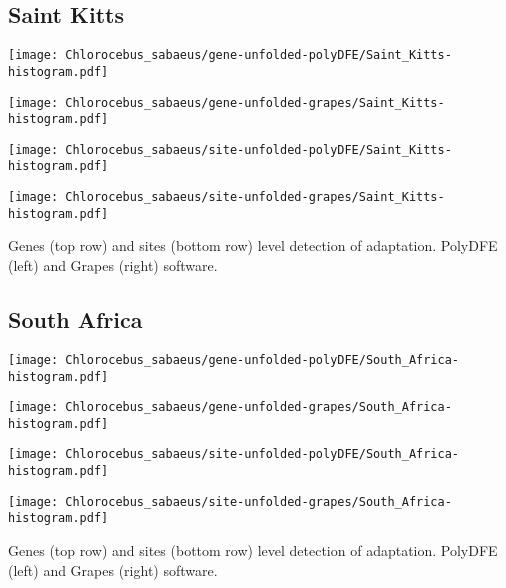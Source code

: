 \documentclass{article}
\begin{document}
\subsection{Saint Kitts}
\centering
\begin{minipage}{0.49\linewidth}
    \texttt{[image: Chlorocebus\_sabaeus/gene-unfolded-polyDFE/Saint\_Kitts-histogram.pdf]}
\end{minipage}%
\hfill
\begin{minipage}{0.49\linewidth}
    \texttt{[image: Chlorocebus\_sabaeus/gene-unfolded-grapes/Saint\_Kitts-histogram.pdf]}
\end{minipage}
\begin{minipage}{0.49\linewidth}
    \texttt{[image: Chlorocebus\_sabaeus/site-unfolded-polyDFE/Saint\_Kitts-histogram.pdf]}
\end{minipage}%
\hfill
\begin{minipage}{0.49\linewidth}
    \texttt{[image: Chlorocebus\_sabaeus/site-unfolded-grapes/Saint\_Kitts-histogram.pdf]}
\end{minipage}
\flushleft
Genes (top row) and sites (bottom row) level detection of adaptation.
PolyDFE (left) and Grapes (right) software.

\subsection{South Africa}
\centering
\begin{minipage}{0.49\linewidth}
    \texttt{[image: Chlorocebus\_sabaeus/gene-unfolded-polyDFE/South\_Africa-histogram.pdf]}
\end{minipage}%
\hfill
\begin{minipage}{0.49\linewidth}
    \texttt{[image: Chlorocebus\_sabaeus/gene-unfolded-grapes/South\_Africa-histogram.pdf]}
\end{minipage}
\begin{minipage}{0.49\linewidth}
    \texttt{[image: Chlorocebus\_sabaeus/site-unfolded-polyDFE/South\_Africa-histogram.pdf]}
\end{minipage}%
\hfill
\begin{minipage}{0.49\linewidth}
    \texttt{[image: Chlorocebus\_sabaeus/site-unfolded-grapes/South\_Africa-histogram.pdf]}
\end{minipage}
\flushleft
Genes (top row) and sites (bottom row) level detection of adaptation.
PolyDFE (left) and Grapes (right) software.
\end{document}
